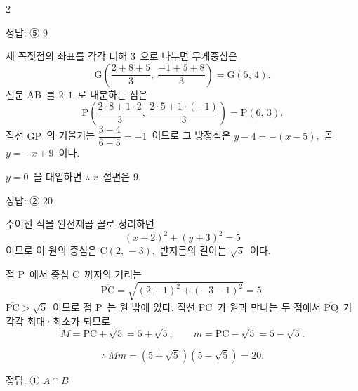 \documentclass[10pt,fleqn]{article}
\begin{document}
\begin{multicols*}{2}

\begin{dmanswerbox}
정답: ⑤ $9$
\end{dmanswerbox}

세 꼭짓점의 좌표를 각각 더해 $3$\ 으로 나누면 무게중심은
$$\mathrm{G}\!\left(\dfrac{2+8+5}{3},\ \dfrac{-1+5+8}{3}\right)=\mathrm{G}(5,\,4).$$
선분 $\mathrm{AB}$\ 를 $2:1$\ 로 내분하는 점은
$$\mathrm{P}\!\left(\dfrac{2\cdot 8+1\cdot 2}{3},\ \dfrac{2\cdot 5+1\cdot(-1)}{3}\right)=\mathrm{P}(6,\,3).$$
직선 $\mathrm{GP}$\ 의 기울기는 $\dfrac{3-4}{6-5}=-1$\ 이므로 그 방정식은 $y-4=-(x-5)$,\ 곧 $y=-x+9$\ 이다.

$y=0$\ 을 대입하면 $\therefore\ x$\ 절편은 $9$.

\begin{dmanswerbox}
정답: ② $20$
\end{dmanswerbox}

주어진 식을 완전제곱 꼴로 정리하면
$$(x-2)^{2}+(y+3)^{2}=5$$
이므로 이 원의 중심은 $\mathrm{C}(2,\,-3)$,\ 반지름의 길이는 $\sqrt{5}$\ 이다.

점 $\mathrm{P}$\ 에서 중심 $\mathrm{C}$\ 까지의 거리는
$$\overline{\mathrm{PC}}=\sqrt{(2+1)^{2}+(-3-1)^{2}}=5.$$
$\overline{\mathrm{PC}}>\sqrt{5}$\ 이므로 점 $\mathrm{P}$\ 는 원 밖에 있다. 직선 $\mathrm{PC}$\ 가 원과 만나는 두 점에서 $\overline{\mathrm{PQ}}$\ 가 각각 최대·최소가 되므로
$$M=\overline{\mathrm{PC}}+\sqrt{5}=5+\sqrt{5},\qquad m=\overline{\mathrm{PC}}-\sqrt{5}=5-\sqrt{5}.$$

$$\therefore\ Mm=(5+\sqrt{5})(5-\sqrt{5})=20.$$

\begin{dmanswerbox}
정답: ① $A\cap B$
\end{dmanswerbox}


\end{multicols*}
\end{document}
